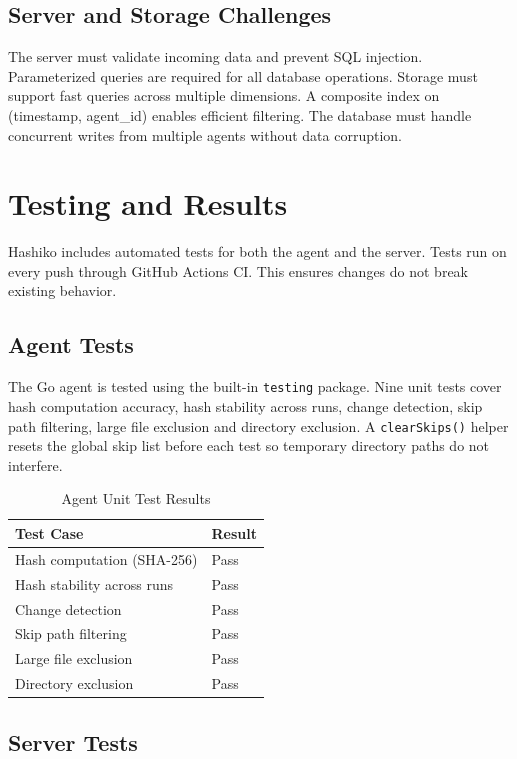\documentclass[conference]{IEEEtran}
\begin{document}
\subsection{Server and Storage Challenges}

The server must validate incoming data and prevent SQL injection. Parameterized queries are required for all database operations. Storage must support fast queries across multiple dimensions. A composite index on (timestamp, agent\_id) enables efficient filtering. The database must handle concurrent writes from multiple agents without data corruption.

\section{Testing and Results}

Hashiko includes automated tests for both the agent and the server. Tests run on every push through GitHub Actions CI. This ensures changes do not break existing behavior.

\subsection{Agent Tests}

The Go agent is tested using the built-in \texttt{testing} package. Nine unit tests cover hash computation accuracy, hash stability across runs, change detection, skip path filtering, large file exclusion and directory exclusion. A \texttt{clearSkips()} helper resets the global skip list before each test so temporary directory paths do not interfere.

\begin{table}[h]
\centering
\caption{Agent Unit Test Results}
\begin{tabular}{|p{4cm}|p{4cm}|}
\hline
\textbf{Test Case} & \textbf{Result} \\
\hline
Hash computation (SHA-256) & Pass \\
\hline
Hash stability across runs & Pass \\
\hline
Change detection & Pass \\
\hline
Skip path filtering & Pass \\
\hline
Large file exclusion & Pass \\
\hline
Directory exclusion & Pass \\
\hline
\end{tabular}
\end{table}

\subsection{Server Tests}
\end{document}
